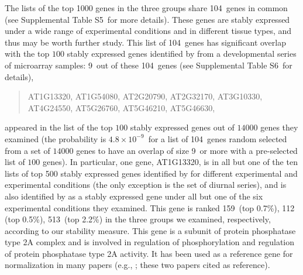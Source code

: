 \documentclass[fleqn,10pt,lineno]{wlpeerj} %
\newcommand{\overlapGene}{104~}
\newcommand{\overlapGeneCze}{9~}
\newcommand{\overlapProb}{$4.8\times 10^{-9}$~}
\newcommand{\rankInSeedling}{159~}
\newcommand{\rankInLeaf}{112~}
\newcommand{\rankInTissue}{513~}
\newcommand{\rankTopPctSeedling}{0.7\%}
\newcommand{\rankTopPctLeaf}{0.5\%}
\newcommand{\rankTopPctTissue}{2.2\%}
\newcommand{\supptablethree}{S5~}
\newcommand{\supptablefour}{S6~}
\begin{document}
	The lists of the top 1000 genes in the three groups share \overlapGene genes in common (see 
	Supplemental Table \supptablethree for more details).  These
	genes are stably expressed under a wide range of experimental conditions and
	in different tissue types, and thus may be worth further study. This list of
	\overlapGene genes has significant overlap with the top $100$ stably expressed genes
	identified by \citeauthor{czechowski2005genome} from a developmental series of
	microarray samples: \overlapGeneCze out of these \overlapGene genes (see Supplemental Table  
	\supptablefour for details),
	\begin{center}
		\begin{quote}
			AT1G13320, AT1G54080, AT2G20790, AT2G32170, AT3G10330,\\
			AT4G24550, AT5G26760, AT5G46210, AT5G46630, \\
		\end{quote}
	\end{center}
	appeared in the list of the top $100$ stably expressed genes
	out of $14000$ genes they examined (the probability is \overlapProb for
	a list of \overlapGene genes random selected from a set of $14000$ genes to have an
	overlap of size \overlapGeneCze or more with a pre-selected list of $100$ genes). In
	particular, one gene, AT1G13320, is in all but one of the ten lists of top 500 stably
	expressed genes identified by \citeauthor{czechowski2005genome} for different
	experimental and experimental conditions (the only exception is the set of
	diurnal series), and is also identified by
	\cite{hong2010identification} as a stably expressed gene under all but one of the six
	experimental conditions they examined.  This gene is ranked \rankInSeedling (top 
	\rankTopPctSeedling), \rankInLeaf
	(top \rankTopPctLeaf), \rankInTissue (top \rankTopPctTissue) in the three
	groups we examined, respectively, according to our stability measure.
	This gene is a subunit of protein phosphatase type 2A complex and is involved in
	regulation of phosphorylation and regulation of protein phosphatase type 2A
	activity. It has been used as a reference gene for normalization in many
	papers (e.g., \citet{baron2012transcriptional,bournier2013arabidopsis};
	these two papers cited \citeauthor{czechowski2005genome} as reference). 
	
\end{document}
